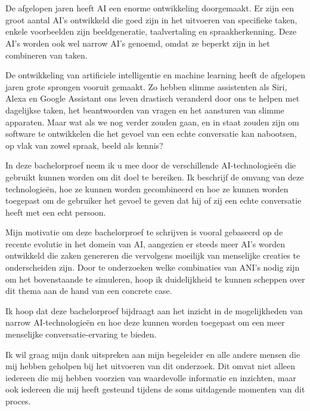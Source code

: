 
\chapter*{}
\label{ch:voorwoord}


De afgelopen jaren heeft AI een enorme ontwikkeling doorgemaakt. Er zijn een groot aantal AI's ontwikkeld die goed zijn in het uitvoeren van specifieke taken, enkele voorbeelden zijn beeldgeneratie, taalvertaling en spraakherkenning. Deze AI's worden ook wel narrow AI's genoemd, omdat ze beperkt zijn in het combineren van taken.

De ontwikkeling van artificiele intelligentie en machine learning heeft de afgelopen jaren grote sprongen vooruit gemaakt. Zo hebben slimme assistenten als Siri, Alexa en Google Assistant ons leven drastisch veranderd door ons te helpen met dagelijkse taken, het beantwoorden van vragen en het aansturen van slimme apparaten. Maar wat als we nog verder zouden gaan, en in staat zouden zijn om software te ontwikkelen die het gevoel van een echte conversatie kan nabootsen, op vlak van zowel spraak, beeld als kennis?

In deze bachelorproef neem ik u mee door de verschillende AI-technologieën die gebruikt kunnen worden om dit doel te bereiken. Ik beschrijf de omvang van deze technologieën, hoe ze kunnen worden gecombineerd en hoe ze kunnen worden toegepast om de gebruiker het gevoel te geven dat hij of zij een echte conversatie heeft met een echt persoon.

Mijn motivatie om deze bachelorproef te schrijven is vooral gebaseerd op de recente evolutie in het domein van AI, aangezien er steeds meer AI's worden ontwikkeld die zaken genereren die vervolgens moeilijk van menselijke creaties te onderscheiden zijn. Door te onderzoeken welke combinaties van ANI's nodig zijn om het bovenstaande te simuleren, hoop ik duidelijkheid te kunnen scheppen over dit thema aan de hand van een concrete case.

Ik hoop dat deze bachelorproef bijdraagt aan het inzicht in de mogelijkheden van narrow AI-technologieën en hoe deze kunnen worden toegepast om een meer menselijke conversatie-ervaring te bieden.

Ik wil graag mijn dank uitspreken aan mijn begeleider en alle andere mensen die mij hebben geholpen bij het uitvoeren van dit onderzoek. Dit omvat niet alleen iedereen die mij hebben voorzien van waardevolle informatie en inzichten, maar ook iedereen die mij heeft gesteund tijdens de soms uitdagende momenten van dit proces.

